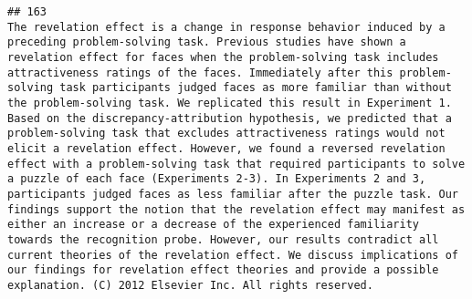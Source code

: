 \documentclass[
  english,
  man]{apa6}
\begin{document}
\begin{verbatim}
## 163                                                                                                                                                                                                                                                                                                                                                                                                                                                                                                                                                                                                                                                                                                                                                                                                                                                                                                                                                                                                                                                                                                                                                                                                                                                                                                                                                                                                                The revelation effect is a change in response behavior induced by a preceding problem-solving task. Previous studies have shown a revelation effect for faces when the problem-solving task includes attractiveness ratings of the faces. Immediately after this problem-solving task participants judged faces as more familiar than without the problem-solving task. We replicated this result in Experiment 1. Based on the discrepancy-attribution hypothesis, we predicted that a problem-solving task that excludes attractiveness ratings would not elicit a revelation effect. However, we found a reversed revelation effect with a problem-solving task that required participants to solve a puzzle of each face (Experiments 2-3). In Experiments 2 and 3, participants judged faces as less familiar after the puzzle task. Our findings support the notion that the revelation effect may manifest as either an increase or a decrease of the experienced familiarity towards the recognition probe. However, our results contradict all current theories of the revelation effect. We discuss implications of our findings for revelation effect theories and provide a possible explanation. (C) 2012 Elsevier Inc. All rights reserved.

\end{verbatim}
\end{document}
